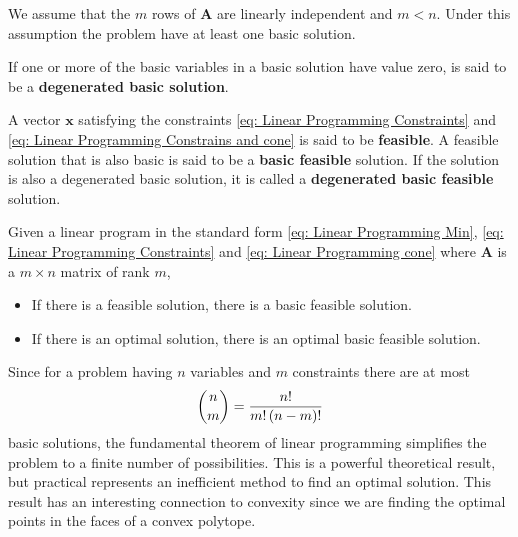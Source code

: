 We assume that the $m$ rows of $\mathbf{A}$ are linearly independent and $m<n$. Under this assumption the problem have at least one basic solution.

\begin{definition}
If one or more of the basic variables in a basic solution have value zero, is said to be a \textbf{degenerated basic solution}.
\end{definition}

\begin{definition}
	A vector $\mathbf{x}$ satisfying the constraints \eqref{eq: Linear Programming Constraints} and \eqref{eq: Linear Programming Constrains and cone} is said to be \textbf{feasible}. A feasible solution that is also basic is said to be a \textbf{basic feasible} solution. If the solution is also a degenerated basic solution, it is called a \textbf{degenerated basic feasible} solution. 
\end{definition} 

\begin{theorem} Given a linear program in the standard form \eqref{eq: Linear Programming Min}, \eqref{eq: Linear Programming Constraints} and \eqref{eq: Linear Programming cone} where $\mathbf{A}$ is a $m\times n $ matrix of rank $m$,
	\begin{itemize}
		\item If there is a feasible solution, there is a basic feasible solution.
		\item If there is an optimal solution, there is an optimal basic feasible solution. 
	\end{itemize}
\end{theorem}
Since for a problem having $n$ variables and $m$ constraints there are at most
\begin{equation*}
	\binom{n}{m}=\frac{n!}{m!\left( n-m \right)!}
\end{equation*}
basic solutions, the fundamental theorem of linear programming simplifies the problem to a finite number of possibilities. This is a  powerful theoretical result, but practical represents an inefficient method to find an optimal solution. This result has an interesting connection to convexity since we are finding the optimal points in the faces of a convex polytope.

